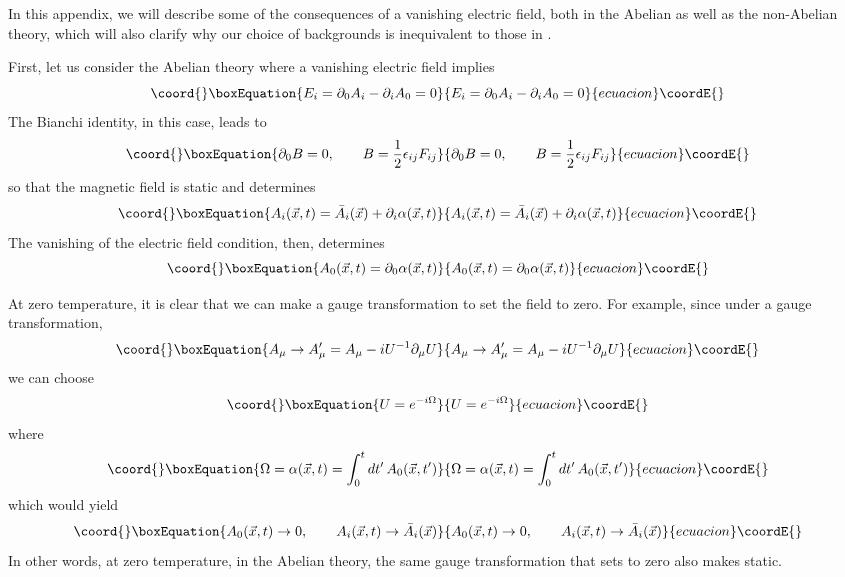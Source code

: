 \documentclass[a4paper,12pt]{article}
\begin{document}
In this appendix, we will describe some of the consequences of a
vanishing electric field, both in the Abelian as well as the
non-Abelian theory, which will also clarify why our choice of
backgrounds is inequivalent to those in \cite{fosco:1997vu}.

First, let us consider the Abelian theory where a vanishing electric
field implies
\begin{equation}\coord{}\boxEquation{
E_{i} = \partial_{0}A_{i} - \partial_{i}A_{0} = 0
}{
E_{i} = \partial_{0}A_{i} - \partial_{i}A_{0} = 0
}{ecuacion}\coordE{}\end{equation}
The Bianchi identity, in this case, leads to
\begin{equation}\coord{}\boxEquation{
\partial_{0} B = 0,\qquad B = {1\over 2} \epsilon_{ij}F_{ij}
}{
\partial_{0} B = 0,\qquad B = {1\over 2} \epsilon_{ij}F_{ij}
}{ecuacion}\coordE{}\end{equation}
so that the magnetic field is static and determines
\begin{equation}\coord{}\boxEquation{
A_{i} (\vec{x},t) = \bar{A}_{i}(\vec{x}) + \partial_{i}\alpha
(\vec{x},t)
}{
A_{i} (\vec{x},t) = \bar{A}_{i}(\vec{x}) + \partial_{i}\alpha
(\vec{x},t)
}{ecuacion}\coordE{}\end{equation}
The vanishing of the electric field condition, then, determines
\begin{equation}\coord{}\boxEquation{
A_{0}(\vec{x},t) = \partial_{0} \alpha(\vec{x},t)
}{
A_{0}(\vec{x},t) = \partial_{0} \alpha(\vec{x},t)
}{ecuacion}\coordE{}\end{equation}

At zero temperature, it is clear that we can make a gauge
transformation to set the \coordHE{} field to zero. For example, since
under a gauge transformation,
\begin{equation}\coord{}\boxEquation{
A_{\mu} \rightarrow A'_{\mu} = A_{\mu} - i U^{-1}\partial_{\mu} U
}{
A_{\mu} \rightarrow A'_{\mu} = A_{\mu} - i U^{-1}\partial_{\mu} U
}{ecuacion}\coordE{}\end{equation}
we can choose
\begin{equation}\coord{}\boxEquation{
U = e^{-i\Omega}
}{
U = e^{-i\Omega}
}{ecuacion}\coordE{}\end{equation}
where
\begin{equation}\coord{}\boxEquation{
\Omega = \alpha (\vec{x},t) = \int_{0}^{t} dt'\,A_{0}(\vec{x},t')
}{
\Omega = \alpha (\vec{x},t) = \int_{0}^{t} dt'\,A_{0}(\vec{x},t')
}{ecuacion}\coordE{}\end{equation}
which would yield
\begin{equation}\coord{}\boxEquation{
A_{0}(\vec{x},t) \rightarrow 0,\qquad A_{i}(\vec{x},t) \rightarrow
\bar{A}_{i}(\vec{x}) 
}{
A_{0}(\vec{x},t) \rightarrow 0,\qquad A_{i}(\vec{x},t) \rightarrow
\bar{A}_{i}(\vec{x}) 
}{ecuacion}\coordE{}\end{equation}
In other words, at zero temperature, in the Abelian theory, the same
gauge transformation that sets \coordHE{} to zero also makes \coordHE{}
static.
\end{document}
